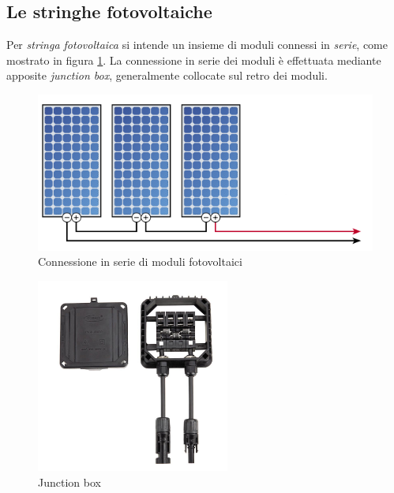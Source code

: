 %
\subsection{Le stringhe fotovoltaiche}
Per \emph{stringa fotovoltaica} si intende un insieme di moduli connessi in \emph{serie}, 
come mostrato in figura \ref{stringa}.
%
La connessione in serie dei moduli \`e effettuata mediante apposite \emph{junction box}, 
generalmente collocate sul retro dei moduli.
%

%
\begin{figure}[!h]
\centering
\includegraphics[width=350pt]{img/pv-string.png}
\caption{Connessione in serie di moduli fotovoltaici}
\label{stringa}
\end{figure}
%
%
\begin{figure}[!h]
\centering
\includegraphics[width=180pt]{img/pv-junction-box.jpg}
\caption{Junction box}
\end{figure}
%

